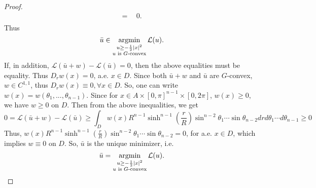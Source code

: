 \begin{proof}
\begin{equation*}
\begin{split}
	=& \ \ 0. \\
	\end{split}
	\end{equation*}
	Thus 
	\begin{equation*}
	\bar{u}\in \argmin\limits_{\substack{u\ge -\frac{1}{2}|x|^2 \\ u \text{ is $G$-convex}}} \mathcal{L}(u) .
	\end{equation*}
	If, in addition,  $\mathcal{L}(\bar{u}+w)-\mathcal{L}(\bar{u})=0$, then the above equalities must be equality. Thus $D_rw(x)=0$, a.e. $x \in D$. Since both $\bar{u}+w$ and $\bar{u}$ are $G$-convex, $w \in C^{1,1}$, thus $D_r w(x)\equiv 0, \forall x\in D$. So, one can write $w(x)= w(\theta_1, ..., \theta_{n-1})$. Since for $x\in A\times [0,\pi]^{n-1}\times[0,2\pi]$, $w(x)\ge 0$, we have $w\ge 0$ on $D$. Then from the above inequalities, we get 
	\begin{equation*}
	0=\mathcal{L}(\bar{u}+w)-\mathcal{L}(\bar{u})\ge \int_D w(x)R^{n-1}\sinh^{n-1}(\frac{r}{R})\sin^{n-2}\theta_1\cdots \sin\theta_{n-2} dr d\theta_1 \cdots d\theta_{n-1}\ge 0
	\end{equation*} 
	Thus, $ w(x)R^{n-1}\sinh^{n-1}(\frac{r}{R})\sin^{n-2}\theta_1\cdots \sin\theta_{n-2} =0$, for a.e. $ x \in D$, which implies $w \equiv 0 $ on $D$. So,  $\bar{u}$ is the unique minimizer, i.e. 
	\begin{equation*}
	\bar{u}= \argmin\limits_{\substack{u\ge -\frac{1}{2}|x|^2 \\ u \text{ is $G$-convex}}} \mathcal{L}(u).
	\end{equation*}




\end{proof}



